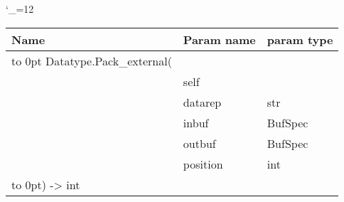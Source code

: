 \begingroup \catcode`\_=12 \tt
\begin{tabular}{lll}
\toprule
\textrm{Name}&\textrm{Param name}&\textrm{param type}\\
\midrule
\hbox to 0pt {Datatype.Pack_external(\hss}\\
& self\\
& datarep & str\\
& inbuf & BufSpec\\
& outbuf & BufSpec\\
& position & int\\
\hbox to 0pt{) -> int\hss}\\
\bottomrule
\end{tabular}
\endgroup
